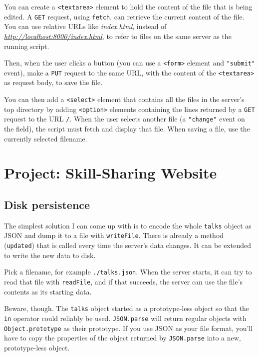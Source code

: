 You can create a \lstinline`<textarea>` element to hold the content of the file that is being edited. A \lstinline`GET` request, using \lstinline`fetch`, can retrieve the current content of the file. You can use relative URLs like \emph{index.html}, instead of \href{http://localhost:8000/index.html}{\emph{http://localhost:8000\slash index.html}}, to refer to files on the same server as the running script.

Then, when the user clicks a button (you can use a \lstinline`<form>` element and \lstinline`"submit"` event), make a \lstinline`PUT` request to the same URL, with the content of the \lstinline`<textarea>` as request body, to save the file.

You can then add a \lstinline`<select>` element that contains all the files in the server's top directory by adding \lstinline`<option>` elements containing the lines returned by a \lstinline`GET` request to the URL \lstinline`/`. When the user selects another file (a \lstinline`"change"` event on the field), the script must fetch and display that file. When saving a file, use the currently selected filename.

\section{Project: Skill-Sharing Website}

\subsection{Disk persistence}

The simplest solution I can come up with is to encode the whole \lstinline`talks` object as JSON and dump it to a file with \lstinline`writeFile`. There is already a method (\lstinline`updated`) that is called every time the server's data changes. It can be extended to write the new data to disk.

Pick a filename, for example \lstinline`./talks.json`. When the server starts, it can try to read that file with \lstinline`readFile`, and if that succeeds, the server can use the file's contents as its starting data.

Beware, though. The \lstinline`talks` object started as a prototype-less object so that the \lstinline`in` operator could reliably be used. \lstinline`JSON.parse` will return regular objects with \lstinline`Object.prototype` as their prototype. If you use JSON as your file format, you'll have to copy the properties of the object returned by \lstinline`JSON.parse` into a new, prototype-less object.

